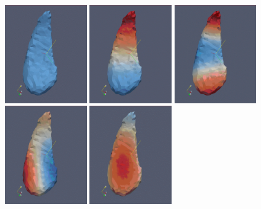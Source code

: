 \documentclass{InsightArticle}
\begin{document}
\begin{figure}
\center
\includegraphics[width=0.32\textwidth]{SurfaceHarmonic_1.png}
\includegraphics[width=0.32\textwidth]{SurfaceHarmonic_2.png}
\includegraphics[width=0.32\textwidth]{SurfaceHarmonic_3.png}
\includegraphics[width=0.32\textwidth]{SurfaceHarmonic_4.png}
\includegraphics[width=0.32\textwidth]{SurfaceHarmonic_5.png}

\end{figure}
\end{document}

